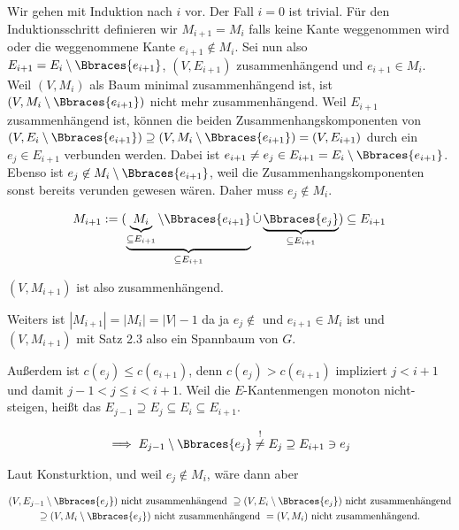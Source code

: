 \begin{solution}
\begin{enumerate}[label = (\Alph*)]
    Wir gehen mit Induktion nach $i$ vor.
    Der Fall $i = 0$ ist trivial.
    Für den Induktionsschritt definieren wir $M_{i+1} = M_i$ falls keine Kante weggenommen wird oder die weggenommene Kante $e_{i+1} \not \in M_i$.
    Sei nun also $E_{i+1} = E_i \setminus \Bbraces{e_{i+1}}$, $(V, E_{i+1})$ zusammenhängend und $e_{i+1} \in M_i$.
    Weil $(V, M_i)$ als Baum minimal zusammenhängend ist, ist $(V, M_i \setminus \Bbraces{e_{i+1}})$ nicht mehr zusammenhängend.
    Weil $E_{i+1}$ zusammenhängend ist, können die beiden Zusammenhangskomponenten von $(V, E_i \setminus \Bbraces{e_{i+1}}) \supseteq (V, M_i \setminus \Bbraces{e_{i+1}}) = (V, E_{i+1})$ durch ein $e_j \in E_{i+1}$ verbunden werden.
    Dabei ist $e_{i+1} \neq e_j \in E_{i+1} = E_i \setminus \Bbraces{e_{i+1}}$.
    Ebenso ist $e_j \not \in M_i \setminus \Bbraces{e_{i+1}}$, weil die Zusammenhangskomponenten sonst bereits verunden gewesen wären.
    Daher muss $e_j \not \in M_i$.

    \begin{align*}
        M_{i+1}
        :=
        (
            \underbrace
            {
                \underbrace{M_i}_{\subseteq E_{i+1}}
                \setminus
                \Bbraces{e_{i+1}}
            }_{
                \subseteq E_{i+1}
            }
            \dot \cup
            \underbrace
            {
                \Bbraces{e_j}
            }_{
                \subseteq E_{i+1}
            }
        )
        \subseteq
        E_{i+1}
    \end{align*}

    $(V, M_{i+1})$ ist also zusammenhängend.

    Weiters ist $|M_{i+1}| = |M_i| = |V| - 1$ da ja $e_j \not \in$ und $e_{i+1} \in M_i$ ist und $(V, M_{i+1})$ mit Satz 2.3 also ein Spannbaum von $G$.

    Außerdem ist $c(e_j) \leq c(e_{i+1})$, denn $c(e_j) > c(e_{i+1})$ impliziert $j < i + 1$ und damit $j-1 < j \leq i < i+1$.
    Weil die $E$-Kantenmengen monoton nicht-steigen, heißt das $E_{j-1} \supseteq E_j \subseteq E_i \subseteq E_{i+1}$.

    \begin{align*}
        \implies
        E_{j-1} \setminus \Bbraces{e_j}
        \stackrel{!}{\neq}
        E_j
        \supseteq
        E_{i+1}
        \ni
        e_j
    \end{align*}

    Laut Konsturktion, und weil $e_j \not \in M_i$, wäre dann aber

    \begin{multline*}
        (V, E_{j-1} \setminus \Bbraces{e_j}) ~\text{nicht zusammenhängend}~
        \supseteq
        (V, E_i     \setminus \Bbraces{e_j}) ~\text{nicht zusammenhängend} \\
        \supseteq
        (V, M_i     \setminus \Bbraces{e_j}) ~\text{nicht zusammenhängend}~
        =
        (V, M_i)                             ~\text{nicht zusammenhängend.}
    \end{multline*}


\end{enumerate}
\end{solution}
